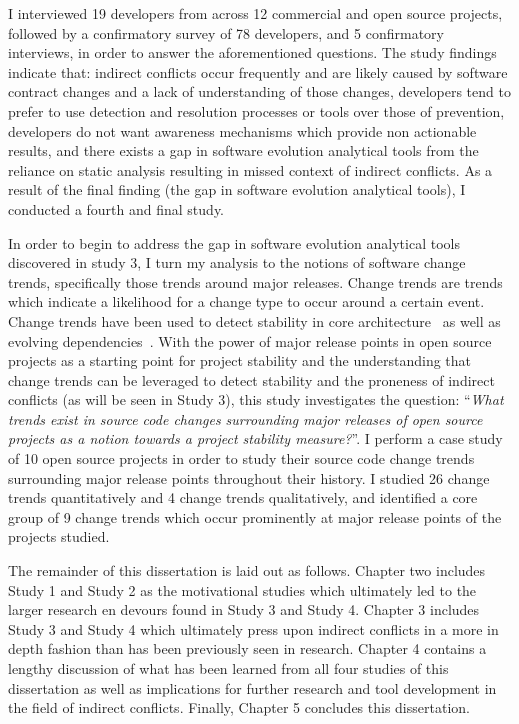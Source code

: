 I interviewed 19 developers from across 12 commercial and open source projects, followed by a confirmatory survey of 78 
developers, and 5 confirmatory interviews, in order to answer the aforementioned questions. The study findings indicate that: 
indirect conflicts occur frequently and are likely caused by software contract changes and a lack of understanding of those changes,
developers tend to prefer to use detection and resolution processes or tools
over those of prevention, developers do not want awareness mechanisms which provide non actionable results, 
and there exists a gap in software evolution analytical tools from the reliance on static analysis resulting in missed
context of indirect conflicts. As a result of the final finding (the gap in software evolution analytical tools), I conducted
a fourth and final study.

In order to begin to address the gap in software evolution analytical tools discovered in study 3, I turn my analysis to the notions 
of software change trends, specifically those trends around major releases. Change trends are trends which indicate
a likelihood for a change type to occur around a certain event. Change trends have been used to detect
stability in core architecture~\cite{Wermelinger:2008:AEE} as well as evolving dependencies~\cite{Businge:2010:ESE}.
With the power of major release points in open source projects as a starting point for project stability and the understanding that change trends can
be leveraged to detect stability and the proneness of indirect conflicts (as will be seen in Study 3), this study investigates the question:
``\textit{What trends exist in source code changes surrounding major releases of open source projects as a notion towards a project
stability measure?}''. I perform a case study of 10 open source projects in order to study their source code change trends surrounding major release points
throughout their history. I studied 26 change trends quantitatively and 4 change trends qualitatively, and identified a core group of 9 change trends which occur
prominently at major release points of the projects studied.

The remainder of this dissertation is laid out as follows. Chapter two includes Study 1 and Study 2 as the motivational studies which
ultimately led to the larger research en devours found in Study 3 and Study 4. Chapter 3 includes Study 3 and Study 4 which ultimately
press upon indirect conflicts in a more in depth fashion than has been previously seen in research. Chapter 4 contains a lengthy discussion
of what has been learned from all four studies of this dissertation as well as implications for further research and tool development
in the field of indirect conflicts. Finally, Chapter 5 concludes this dissertation.